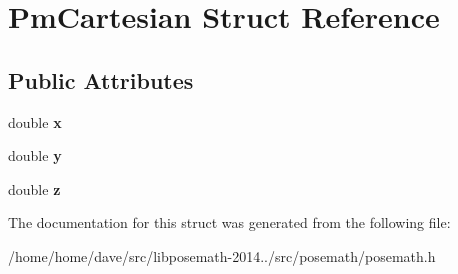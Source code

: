\hypertarget{structPmCartesian}{}\section{Pm\+Cartesian Struct Reference}
\label{structPmCartesian}
\subsection*{Public Attributes}
\begin{DoxyCompactItemize}
\item 
\hypertarget{structPmCartesian_a145c5fdd25037b86b5fa002e7d3e03b2}{}double {\bfseries x}\label{structPmCartesian_a145c5fdd25037b86b5fa002e7d3e03b2}

\item 
\hypertarget{structPmCartesian_a4d6af7d58c93464d7caefde53f35e8b2}{}double {\bfseries y}\label{structPmCartesian_a4d6af7d58c93464d7caefde53f35e8b2}

\item 
\hypertarget{structPmCartesian_a7bcca0d664a97cc106b726b6bf67ed89}{}double {\bfseries z}\label{structPmCartesian_a7bcca0d664a97cc106b726b6bf67ed89}

\end{DoxyCompactItemize}


The documentation for this struct was generated from the following file\+:\begin{DoxyCompactItemize}
\item 
/home/home/dave/src/libposemath-\/2014../src/posemath/posemath.\+h\end{DoxyCompactItemize}
